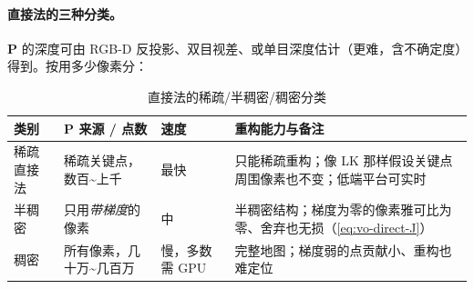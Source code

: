 \paragraph{直接法的三种分类\cite{gaoxiang2019slam14}。}$\mathbf{P}$ 的深度可由 RGB-D 反投影、双目视差、或单目深度估计（更难，含不确定度）得到。按用多少像素分：

\begin{table}[H]\centering\small
\caption{直接法的稀疏/半稠密/稠密分类}
\label{tab:vo-direct-class}
\begin{tabular}{p{}p{}p{}p{}}
\toprule
类别 & $\mathbf{P}$ 来源 / 点数 & 速度 & 重构能力与备注 \\
\midrule
稀疏直接法 & 稀疏关键点，数百\textasciitilde 上千 & 最快 & 只能稀疏重构；像 LK 那样假设关键点周围像素也不变；低端平台可实时 \\
半稠密 & 只用\emph{带梯度}的像素 & 中 & 半稠密结构；梯度为零的像素雅可比为零、舍弃也无损（\cref{eq:vo-direct-J}）\\
稠密 & 所有像素，几十万\textasciitilde 几百万 & 慢，多数需 GPU & 完整地图；梯度弱的点贡献小、重构也难定位 \\
\bottomrule
\end{tabular}
\end{table}

